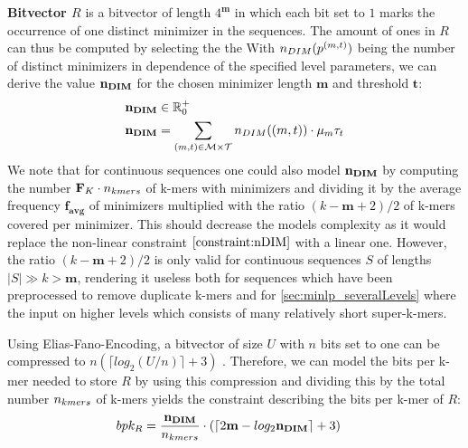 \documentclass[a4paper,titlepage,onecolumn,oneside,12pt,nenglish,titlepage=firstiscover]{scrbook}
\theoremstyle{plain} %
\theoremstyle{definition} %
\theoremstyle{remark} %
\theoremstyle{plain}
\newcommand{\RR}{\mathbb{R}} %
\newcommand{\minimizerLength}{m}
\newcommand{\threshold}{t}
\newcommand{\contains}{contains}
\newcommand{\timeForOperationOnStructure}[2]{T_{#1_{#2}}} %
\newcommand{\varAverageFrequency}{\textbf{f}_{\textbf{avg}}}
\newcommand{\possibleMinimizerLengths}{\mathcal{M}}
\newcommand{\possibleThresholds}{\mathcal{T}}
\newcommand{\indicatorm}{\mu}
\newcommand{\indicatort}{\tau}
\newcommand{\varMinimizerLength}{\textbf{\minimizerLength}}
\newcommand{\varThreshold}{\textbf{\threshold}}
\begin{document}
\textbf{Bitvector $R$} is a bitvector of length $4^\varMinimizerLength$ in which each bit set to $1$ marks the occurrence of one distinct \infrequent minimizer in the sequences. The amount of ones in $R$ can thus be computed by selecting the the With $\numberOfDistinctMinimizers{\levelParameters{(\minimizerLength, \threshold)}}$ being the number of distinct \infrequent minimizers in dependence of the specified level parameters, we can derive the value $\textbf{n}_{\textbf{DIM}}$ for the chosen minimizer length $\varMinimizerLength$ and threshold $\varThreshold$:
\newcommand{\nDIMExpression}{
	\varNumberOfDistinctMinimizers &= \sum\limits_{(\minimizerLength, \threshold) \in \possibleMinimizerLengths \times \possibleThresholds}
	\numberOfDistinctMinimizers{(\minimizerLength, \threshold)} \cdot
	\indicatorm_\minimizerLength \indicatort_\threshold
}
\begin{align}
	\varNumberOfDistinctMinimizers &\in \RR^+_0 \label{variable:nDIM}\\
	\nDIMExpression \label{constraint:nDIM}
\end{align}
We note that for continuous sequences one could also model $\textbf{n}_{\textbf{DIM}}$ by computing the number $\textbf{F}_{K} \cdot n_{kmers}$ of k-mers with \infrequent minimizers and dividing it by the average frequency $\varAverageFrequency$ of minimizers multiplied with the ratio $(k-\varMinimizerLength+2)/2$ of k-mers covered per minimizer. This should decrease the models complexity as it would replace the non-linear constraint $\cref{constraint:nDIM}$ with a linear one. However, the ratio $(k-\varMinimizerLength+2)/2$ is only valid for continuous sequences $S$ of lengths $|S| \gg k > \varMinimizerLength$, rendering it useless both for sequences which have been preprocessed to remove duplicate k-mers and for \cref{sec:minlp_severalLevels} where the input on higher levels which consists of many relatively short super-k-mers.

Using Elias-Fano-Encoding, a bitvector of size $U$ with $n$ bits set to one can be compressed to
$n (\lceil log_2(U/n) \rceil + 3)$ \cite{okanohara2007practical} . Therefore, we can model the bits per k-mer needed to store $R$ by using this compression and dividing this by the total number $n_{kmers}$ of k-mers yields the constraint describing the bits per k-mer of $R$:
\newcommand{\bpkR}{bpk_{R} &= \frac{\varNumberOfDistinctMinimizers}{\nkmers} \cdot \left(\lceil 2\varMinimizerLength - log_2\varNumberOfDistinctMinimizers \rceil + 3 \right)}
\begin{align}
	\bpkR \label{constraint:bpkR}
\end{align}
\end{document}

